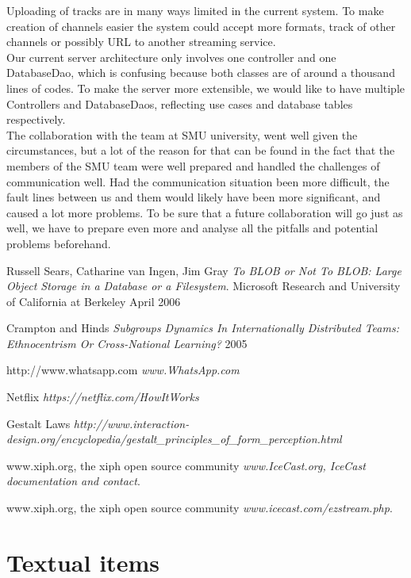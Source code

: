 \documentclass[a4paper,11pt,report]{article}
\begin{document}
Uploading of tracks are in many ways limited in the current system. To make creation of channels easier the system could accept more formats, track of other channels or possibly URL to another streaming service. \\
Our current server architecture only involves one controller and one DatabaseDao, which is confusing because both classes are of around a thousand lines of codes. To make the server more extensible, we would like to have multiple Controllers and DatabaseDaos, reflecting use cases and database tables respectively. \\
The collaboration with the team at SMU university, went well given the circumstances, but a lot of the reason for that can be found in the fact that the members of the SMU team were well prepared and handled the challenges of communication well. Had the communication situation been more difficult, the fault lines between us and them would likely have been more significant, and caused a lot more problems. To be sure that a future collaboration will go just as well, we have to prepare even more and analyse all the pitfalls and potential problems beforehand.

\begin{thebibliography}{9}
  Russell Sears, Catharine van Ingen, Jim Gray
  \emph{To BLOB or Not To BLOB: 
Large Object Storage in a Database or a Filesystem}.
  Microsoft Research and University of California at Berkeley
  April 2006
  
 Crampton and Hinds \emph{Subgroups Dynamics In
Internationally Distributed
Teams: Ethnocentrism Or
Cross-National Learning? } 2005
	
 http://www.whatsapp.com \emph{www.WhatsApp.com}
	
 Netflix \emph{https://netflix.com/HowItWorks}

 Gestalt Laws \emph{http://www.interaction-design.org/encyclopedia/gestalt\_principles\_of\_form\_perception.html}
	
  www.xiph.org, the xiph open source community
  \emph{www.IceCast.org, IceCast documentation and contact}.
    
  www.xiph.org, the xiph open source community
  \emph{www.icecast.com/ezstream.php}.
\end{thebibliography}
\newpage
\appendix
\section{Textual items}
\end{document}
